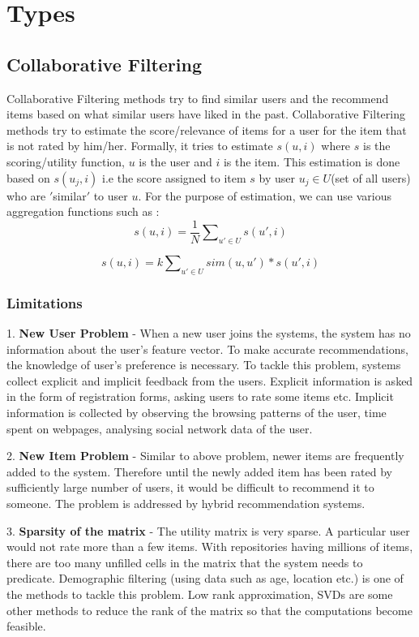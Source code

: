 \section{Types}
\subsection{Collaborative Filtering}
Collaborative Filtering methods try to find similar users and the recommend items based on what similar users have liked in the past. Collaborative Filtering methods try to estimate the score/relevance of items for a user for the item that is not rated by him/her. Formally, it tries to estimate $s(u,i)$ where $s$ is the scoring/utility function, $u$ is the user and $i$ is the item. This estimation is done based on $s(u_j,i)$ i.e the score assigned to item $s$ by user $u_j\in U$(set of all users) who are $'$similar$'$ to user $u$. For the purpose of estimation, we can use various aggregation functions such as : 
\begin{equation}
s(u,i) = \frac{1}{N}\sum\nolimits_{u' \in U} s(u',i) 
\end{equation}

\begin{equation}
s(u,i) = k\sum\nolimits_{u' \in U} sim(u,u') * s(u',i) 
\end{equation}

\subsubsection{Limitations}

1. {\bf New User Problem} - When a new user joins the systems, the system has no information about the user's feature vector. To make accurate recommendations, the knowledge of user's preference is necessary. To tackle this problem, systems collect explicit and implicit feedback from the users. Explicit information is asked in the form of registration forms, asking users to rate some items etc. Implicit information is collected by observing the browsing patterns of the user, time spent on webpages, analysing social network data of the user.

2. {\bf New Item Problem} - Similar to above problem, newer items are frequently added to the system. Therefore until the newly added item has been rated by sufficiently large number of users, it would be difficult to recommend it to someone. The problem is addressed by hybrid recommendation systems.

3. {\bf Sparsity of the matrix} - The utility matrix is very sparse. A particular user would not rate more than a few items. With repositories having millions of items, there are too many unfilled cells in the matrix that the system needs to predicate. Demographic filtering (using data such as age, location etc.) is one of the methods to tackle this problem. Low rank approximation, SVDs are some other methods to reduce the rank of the matrix so that the computations become feasible. 

